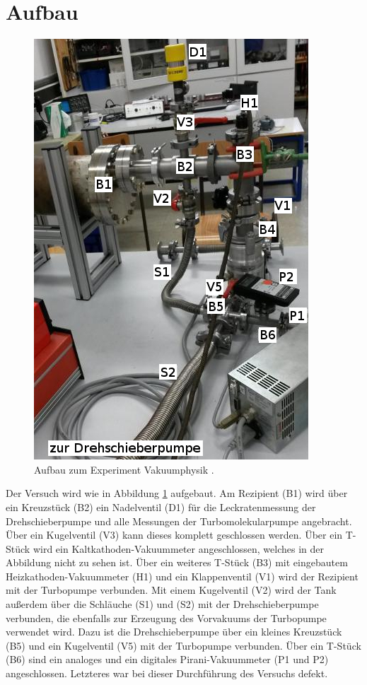 
\section{Aufbau}
\label{sec:Aufbau}

\begin{figure}
\vspace{-0.5cm}
\includegraphics[scale=0.5]{content/images/Aufbau2.jpg}
\caption{Aufbau zum Experiment Vakuumphysik \cite{V70}.}
\label{fig:Aufbau}
\end{figure}

Der Versuch wird wie in Abbildung \ref{fig:Aufbau} aufgebaut. Am Rezipient (B1) wird über ein Kreuzstück (B2) ein Nadelventil (D1) für die Leckratenmessung der Drehschieberpumpe und alle Messungen der Turbomolekularpumpe angebracht. Über ein Kugelventil (V3) kann dieses komplett geschlossen werden. Über ein T-Stück wird ein Kaltkathoden-Vakuummeter angeschlossen, welches in der Abbildung nicht zu sehen ist. Über ein weiteres T-Stück (B3) mit eingebautem Heizkathoden-Vakuummeter (H1) und ein Klappenventil (V1) wird der Rezipient mit der Turbopumpe verbunden. Mit einem Kugelventil (V2) wird der Tank außerdem über die Schläuche (S1) und (S2) mit der Drehschieberpumpe verbunden, die ebenfalls zur Erzeugung des Vorvakuums der Turbopumpe verwendet wird. Dazu ist die Drehschieberpumpe über ein kleines Kreuzstück (B5) und ein Kugelventil (V5) mit der Turbopumpe verbunden. Über ein T-Stück (B6) sind ein analoges und ein digitales Pirani-Vakuummeter (P1 und P2) angeschlossen. Letzteres war bei dieser Durchführung des Versuchs defekt.